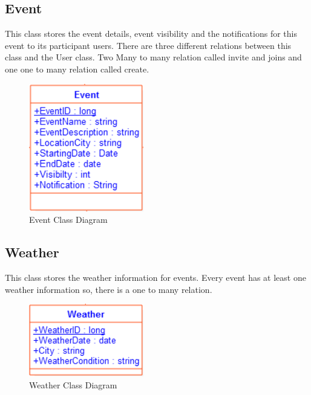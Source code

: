 \subsection{Event}
\quad This class stores the event details, event visibility and the notifications for this event to its participant users. There are three different relations between this class and the User class. Two Many to many relation called invite and joins and one one to many relation called create.
\begin{figure}[tbh]
  \begin{center}
  \includegraphics[width=50mm]{EventClassDiagram}
  \caption{Event Class Diagram}\label{Fig :}
  \end{center}
\end{figure}

\subsection{Weather}
\quad This class stores the weather information for events. Every event has at least one weather information so, there is a one to many relation.
\begin{figure}[tbh]
  \begin{center}
  \includegraphics[width=50mm]{WeatherClassDiagram}
  \caption{Weather Class Diagram}\label{Fig :}
  \end{center}
\end{figure}
